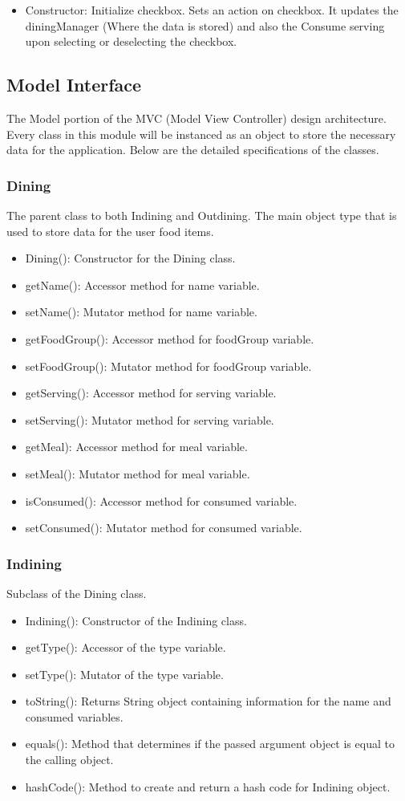 \documentclass{scrreprt}
\begin{document}
\begin{itemize}
	\item Constructor: Initialize checkbox. Sets an action on checkbox. It updates the diningManager (Where the data is stored) and also the Consume serving upon selecting or deselecting the checkbox.
\end{itemize}
\subsection{Model Interface}
The Model portion of the MVC (Model View Controller) design architecture. Every class in this module will be instanced as an object to store the necessary data for the application. Below are the detailed specifications of the classes.

\subsubsection{Dining}
The parent class to both Indining and Outdining. The main object type that is used to store data for the user food items.
\begin{itemize}
\item Dining(): Constructor for the Dining class.
\item getName(): Accessor method for name variable.
\item setName(): Mutator method for name variable.
\item getFoodGroup(): Accessor method for foodGroup variable.
\item setFoodGroup(): Mutator method for foodGroup variable.
\item getServing(): Accessor method for serving variable.
\item setServing(): Mutator method for serving variable.
\item getMeal): Accessor method for meal variable.
\item setMeal(): Mutator method for meal variable.
\item isConsumed(): Accessor method for consumed variable.
\item setConsumed(): Mutator method for consumed variable.
\end{itemize}

\subsubsection{Indining}
Subclass of the Dining class.

\begin{itemize}
\item Indining(): Constructor of the Indining class.
\item getType(): Accessor of the type variable.
\item setType(): Mutator of the type variable.
\item toString(): Returns String object containing information for the name and consumed variables.
\item equals(): Method that determines if the passed argument object is equal to the calling object.
\item hashCode(): Method to create and return a hash code for Indining object.
\end{itemize}
\end{document}
